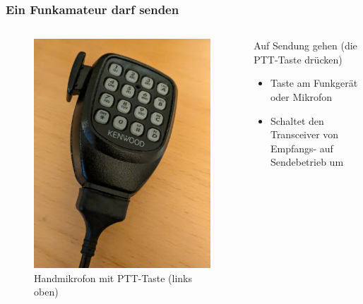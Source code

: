 \begin{frame}
\frametitle{Ein Funkamateur darf senden}
\begin{columns}
    \begin{column}{0.28\textwidth}
    
\begin{figure}
    \includegraphics[width=1.0\textwidth]{foto/118}
    \caption{\scriptsize Handmikrofon mit PTT-Taste (links oben)}
    \label{n_erste_schritte_ptt}
\end{figure}

    \end{column}
   \begin{column}{0.68\textwidth}
       Auf Sendung gehen (die PTT-Taste drücken)

\begin{itemize}
  \item Taste am Funkgerät oder Mikrofon
  \item Schaltet den Transceiver von Empfangs- auf Sendebetrieb um
  \end{itemize}

   \end{column}
\end{columns}

\end{frame}

